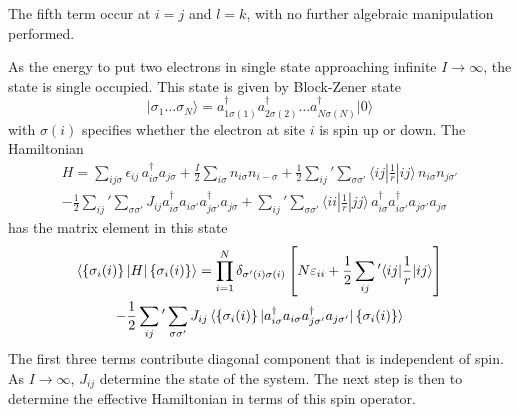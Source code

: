 \documentclass[../../../main.tex]{subfiles}
\begin{document}
The fifth term occur at $i=j$ and $l=k$, with no further algebraic manipulation performed.

As the energy to put two electrons in single state approaching infinite $I \to \infty$, the state is single occupied.
This state is given by Block-Zener state
\begin{equation*}
    \lvert \sigma_1 \dots \sigma_N \rangle  = a^\dagger_{1\sigma(1)} a^\dagger_{2\sigma(2)}\dots a^\dagger_{N\sigma(N)}\lvert 0\rangle
\end{equation*}
with $\sigma(i)$ specifies whether the electron at site $i$ is spin up or down.
The Hamiltonian
\begin{multline*}
    H = \sum_{ij\sigma} \epsilon_{ij}\,a_{i\sigma}^{\dagger}a_{j\sigma}
    + \frac{I}{2}\sum_{i\sigma}n_{i\sigma}n_{i-\sigma}
    + \frac{1}{2}\sum_{ij}^{ }{} '  \sum_{\sigma\sigma'}\langle ij|\frac{1}{r}|ij\rangle\,n_{i\sigma}n_{j\sigma'}\\
    -\frac{1}{2}\sum_{ij}{}' \sum_{\sigma\sigma'}J_{ij}a_{i\sigma}^{\dagger}a_{i\sigma'}a_{j\sigma'}^{\dagger}a_{j\sigma}
    + \sum_{ij} {} ' \sum_{\sigma\sigma'}\langle ii|\frac{1}{r}|jj\rangle\,a_{i\sigma}^{\dagger}a_{i\sigma'}^{\dagger}a_{j\sigma'}a_{j\sigma}
\end{multline*}
has the matrix element in this state
\begin{multline*}
    \braket{\left\{ \sigma_i(i) \right\}  |H |\left\{ \sigma_i(i)  \right\} } = \prod_{i=1}^N \delta_{\sigma'(i)\sigma(i)} \left[N\varepsilon_{ii}+\frac{1}{2}\sum_{ij} {}' \langle ij|\frac{1}{r}|ij\rangle\right] \\
    -\frac{1}{2}\sum_{ij} {}' \sum_{\sigma\sigma'}J_{ij}
    \braket{\left\{ \sigma_i(i) \right\}  |a^\dagger_{i\sigma}a_{i\sigma}a^\dagger_{j\sigma'}a_{j\sigma'}|\left\{ \sigma_i(i) \right\} }
\end{multline*}
The first three terms contribute diagonal component that is independent of spin.
As $I \rightarrow \infty$, $J_{ij}$ determine the state of the system.
The next step is then to determine the effective Hamiltonian in terms of this spin operator.
\end{document}
